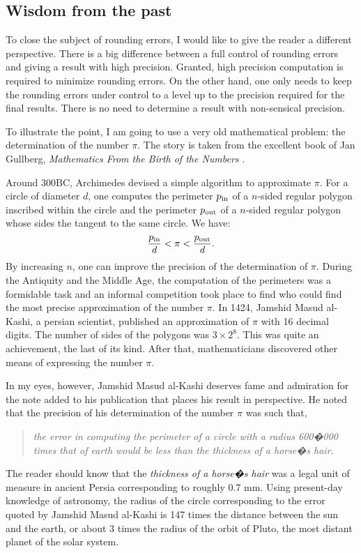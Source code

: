 \documentclass[twoside]{book}
\begin{document}
\subsection{Wisdom from the past}
To close the subject of rounding errors, I would like to give the
reader a different perspective. There is a big difference between
a full control of rounding errors and giving a result with high
precision. Granted, high precision computation is required to
minimize rounding errors. On the other hand, one only needs to
keep the rounding errors under control to a level up to the
precision required for the final results. There is no need to
determine a result with non-sensical precision.

To illustrate the point, I am going to use a very old mathematical
problem: the determination of the number $\pi$. The story is taken
from the excellent book of Jan Gullberg, {\em Mathematics From the
Birth of the Numbers} \cite{Gullberg}.

Around 300BC, Archimedes devised a simple algorithm to approximate
$\pi$. For a circle of diameter $d$, one computes the perimeter
$p_{\mathop{\rm in}}$ of a $n$-sided regular polygon inscribed
within the circle and the perimeter $p_{\mathop{\rm out}}$ of a
$n$-sided regular polygon whose sides the tangent to the same
circle. We have:
\begin{equation}
{\displaystyle p_{\mathop{\rm in}} \over\displaystyle d
}<\pi<{\displaystyle p_{\mathop{\rm out}} \over\displaystyle d}.
\end{equation}
By increasing $n$, one can improve the precision of the
determination of $\pi$. During the Antiquity and the Middle Age,
the computation of the perimeters was a formidable task and an
informal competition took place to find who could find the most
precise approximation of the number $\pi$. In 1424, Jamshid Masud
al-Kashi, a persian scientist, published an approximation of $\pi$
with 16 decimal digits. The number of sides of the polygons was
$3\times 2^8$. This was quite an achievement, the last of its
kind. After that, mathematicians discovered other means of
expressing the number $\pi$.

In my eyes, however, Jamshid Masud al-Kashi deserves fame and
admiration for the note added to his publication that places his
result in perspective. He noted that the precision of his
determination of the number $\pi$ was such that,
\begin{quote}{\it the error
in computing the perimeter of a circle with a radius 600�000 times
that of earth would be less than the thickness of a horse�s hair}.
\end{quote}
The reader should know that the {\it thickness of a horse�s
hair\/} was a legal unit of measure in ancient Persia
corresponding to roughly 0.7 mm. Using present-day knowledge of
astronomy, the radius of the circle corresponding to the error
quoted by Jamshid Masud al-Kashi is 147 times the distance between
the sun and the earth, or about 3 times the radius of the orbit of
Pluto, the most distant planet of the solar system.
\end{document}
